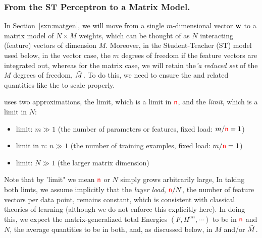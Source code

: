 \subsubsection{From the ST Perceptron to a Matrix Model.} 
\label{sxn:from_vectors}
In Section~\ref{sxn:matgen}, we will move from a single $m$-dimensional \Perceptron vector ${\mathbf{w}}$ 
to a matrix model of $N \times M$ weights, which can be thought of
as $N$ interacting (feature) vectors of dimension $M$.
Moreover, in the Student-Teacher (ST) model used below,
in the vector case, the $m$ degrees of freedom if the feature vectors are integrated out,
whereas for the matrix case, we will retain the\emph{'a reduced set} of the  $M$ degrees of freedom, $\tilde{M}$.  To do this, we need to ensure the \FreeEnergies and related quantities like the \LayerQualitySquared to scale properly.

\SETOL uses two \LargeN approximations, the \Thermodynamic limit, which is a \LargeN limit in ${\color{red}\sf{n}}$, and the \emph{\WideLayer limit}, which is a \LargeN limit in $N$:
\begin{itemize}
    \item \Thermodynamic limit: $m \gg 1$ (the number of parameters or features, fixed load: $m/{\color{red}\sf{n}} = 1$)
    \item \LargeN limit in n: $n\gg 1$ (the number of training examples, fixed load: $m/{\color{red}\sf{n}} = 1$)
    \item \WideLayer limit: $N\gg 1$ (the larger matrix dimension)
\end{itemize}
Note that by 'limit" we mean ${\color{red}\sf{n}}$ or $N$ simply grows arbitrarily large,  In taking both \LargeN limts, we assume implicitly that  the \emph{layer load}, ${\color{red}\sf{n}}/N$, the number of feature vectors per data point, remains constant, which is consistent with classical \STATMECH theories of learning\cite{MM17_TR} (although we do not enforce this explicitly here).  
In doing this, we expect the matrix-generalized total Energies $(F, H^{an}, \cdots)$ to be \SizeExtensive in ${\color{red}\sf{n}}$ and $N$,  the average quantities to be \SizeIntensive in both, 
and, as discussed below, \emph{\SizeConsistent} in $M$ and/or $\tilde{M}$.


